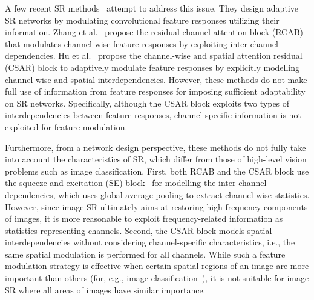 \documentclass[final,5p,times,twocolumn]{elsarticle}
\begin{document}
A few recent SR methods~\cite{zhang2018rcan, hu2018channel} attempt to address this issue.
They design adaptive SR networks by modulating convolutional feature responses utilizing their information.
Zhang et al.~\cite{zhang2018rcan} propose the residual channel attention block (RCAB) that modulates channel-wise feature responses by exploiting inter-channel dependencies. 
Hu et al.~\cite{hu2018channel} propose the channel-wise and spatial attention residual (CSAR) block to adaptively modulate feature responses by explicitly modelling channel-wise and spatial interdependencies.
However, these methods do not make full use of information from feature responses for imposing sufficient adaptability on SR networks.
Specifically, although the CSAR block exploits two types of interdependencies between feature responses, channel-specific information is not exploited for feature modulation. 

Furthermore, from a network design perspective, these methods do not fully take into account the characteristics of SR, which differ from those of high-level vision problems such as image classification.
First, both RCAB and the CSAR block use the squeeze-and-excitation (SE) block~\cite{hu2018squeeze} for modelling the inter-channel dependencies, which uses global average pooling to extract channel-wise statistics.
However, since image SR ultimately aims at restoring high-frequency components of images, it is more reasonable to exploit frequency-related information as statistics representing channels.
Second, the CSAR block models spatial interdependencies without considering channel-specific characteristics, i.e., the same spatial modulation is performed for all channels.
While such a feature modulation strategy is effective when certain spatial regions of an image are more important than others (for, e.g., image classification~\cite{woo2018cbam}), it is not suitable for image SR where all areas of images have similar importance.
\end{document}

